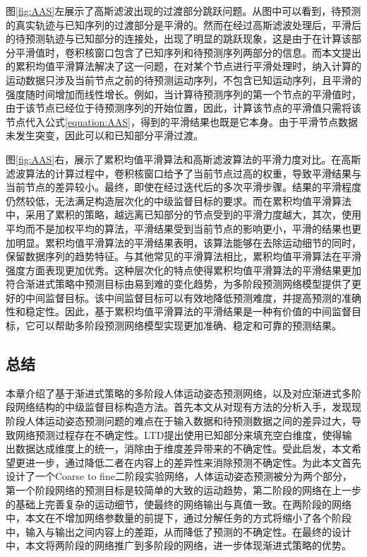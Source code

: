 图\ref{fig:AAS}左展示了高斯滤波出现的过渡部分跳跃问题。从图中可以看到，待预测的真实轨迹与已知序列的过渡部分是平滑的。然而在经过高斯滤波处理后，平滑后的待预测轨迹与已知部分的连接处，出现了明显的跳跃现象，这是由于在计算该部分平滑值时，卷积核窗口包含了已知序列和待预测序列两部分的信息。而本文提出的累积均值平滑算法解决了这一问题，在对某个节点进行平滑处理时，纳入计算的运动数据只涉及当前节点之前的待预测运动序列，不包含已知运动序列，且平滑的强度随时间增加而线性增长。例如，当计算待预测序列的第一个节点的平滑值时，由于该节点已经位于待预测序列的开始位置，因此，计算该节点的平滑值只需将该节点代入公式\ref{equation:AAS}，得到的平滑结果也既是它本身。由于平滑节点数据未发生突变，因此可以和已知部分平滑过渡。

图\ref{fig:AAS}右，展示了累积均值平滑算法和高斯滤波算法的平滑力度对比。在高斯滤波算法的计算过程中，卷积核窗口给予了当前节点过高的权重，导致平滑结果与当前节点的差异较小。最终，即使在经过迭代后的多次平滑步骤。结果的平滑程度仍然较低，无法满足构造层次化的中级监督目标的要求。而在累积均值平滑算法中，采用了累积的策略，越远离已知部分的节点受到的平滑力度越大，其次，使用平均而不是加权平均的算法，平滑结果受到当前节点的影响更小，平滑的结果也更加明显。累积均值平滑算法的平滑结果表明，该算法能够在去除运动细节的同时，保留数据序列的趋势特征。与其他常见的平滑算法相比，累积均值平滑算法在平滑强度方面表现更加优秀。这种层次化的特点使得累积均值平滑算法的平滑结果更加符合渐进式策略中预测目标由易到难的变化趋势，为多阶段预测网络模型提供了更好的中间监督目标。该中间监督目标可以有效地降低预测难度，并提高预测的准确性和稳定性。因此，基于累积均值平滑算法的平滑结果是一种有价值的中间监督目标，它可以帮助多阶段预测网络模型实现更加准确、稳定和可靠的预测结果。

\subsection{总结}
本章介绍了基于渐进式策略的多阶段人体运动姿态预测网络，以及对应渐进式多阶段网络结构的中级监督目标构造方法。首先本文从对现有方法的分析入手，发现现阶段人体运动姿态预测问题的难点在于输入数据和待预测数据之间的差异过大，导致网络预测过程存在不确定性。LTD提出使用已知部分来填充空白维度，使得输出数据达成维度上的统一，消除由于维度差异带来的不确定性。受此启发，本文希望更进一步，通过降低二者在内容上的差异性来消除预测不确定性。为此本文首先设计了一个Coarse to fine二阶段实验网络，人体运动姿态预测被分为两个部分，第一个阶段网络的预测目标是较简单的大致的运动趋势，第二阶段的网络在上一步的基础上完善复杂的运动细节，使最终的网络输出与真值一致。在两阶段的网络中，本文在不增加网络参数量的前提下，通过分解任务的方式将缩小了各个阶段中，输入与输出之间内容上的差距，从而降低了预测的不确定性。在最终的设计中，本文将两阶段的网络推广到多阶段的网络，进一步体现渐进式策略的优势。

